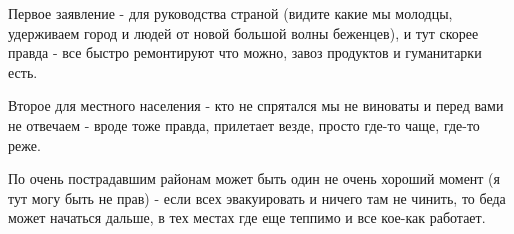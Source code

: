 \begin{itemize}
Первое заявление - для руководства страной (видите какие мы молодцы, удерживаем
город и людей от новой большой волны беженцев), и тут скорее правда - все
быстро ремонтируют что можно, завоз продуктов и гуманитарки есть.

Второе для местного населения - кто не спрятался мы не виноваты и перед вами не
отвечаем - вроде тоже правда, прилетает везде, просто где-то чаще, где-то реже.

По очень пострадавшим районам может быть один не очень хороший момент (я тут
могу быть не прав) - если всех эвакуировать и ничего там не чинить, то беда
может начаться дальше, в тех местах где еще теппимо и все кое-как работает.

\end{itemize} %
